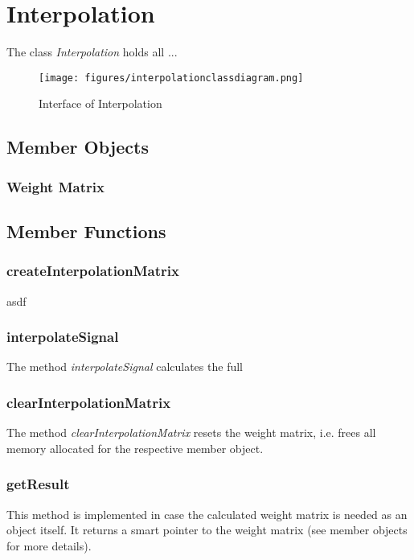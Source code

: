 \clearpage


\section{Interpolation}
The class \textit{Interpolation} holds all ...

\begin{figure}[h]
	\begin{center}
		\texttt{[image: figures/interpolationclassdiagram.png]}
		\caption{Interface of Interpolation}
	\end{center}
\end{figure}

\subsection{Member Objects}

\subsubsection{Weight Matrix}

\subsection{Member Functions}

\subsubsection{createInterpolationMatrix}
asdf

\subsubsection{interpolateSignal}
The method \textit{interpolateSignal} calculates the full

\subsubsection{clearInterpolationMatrix}
The method \textit{clearInterpolationMatrix} resets the weight matrix, i.e. frees all memory allocated for the respective member object.

\subsubsection{getResult}
This method is implemented in case the calculated weight matrix is needed as an object itself. It returns a smart pointer to the weight matrix (see member objects for more details).

